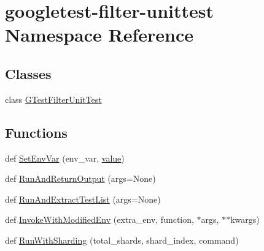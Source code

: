 \hypertarget{namespacegoogletest-filter-unittest}{}\section{googletest-\/filter-\/unittest Namespace Reference}
\label{namespacegoogletest-filter-unittest}
\subsection*{Classes}
\begin{DoxyCompactItemize}
\item 
class \mbox{\hyperlink{classgoogletest-filter-unittest_1_1_g_test_filter_unit_test}{G\+Test\+Filter\+Unit\+Test}}
\end{DoxyCompactItemize}
\subsection*{Functions}
\begin{DoxyCompactItemize}
\item 
def \mbox{\hyperlink{namespacegoogletest-filter-unittest_a829bf5a2df452c96f0ad7a1f0d47401e}{Set\+Env\+Var}} (env\+\_\+var, \mbox{\hyperlink{_obj__test_2lib_2googletest-master_2googlemock_2test_2gmock-matchers__test_8cc_a337b8a670efc0b086ad3af163f3121b6}{value}})
\item 
def \mbox{\hyperlink{namespacegoogletest-filter-unittest_a24bae2131f3ea9a470f76a090f704d23}{Run\+And\+Return\+Output}} (args=None)
\item 
def \mbox{\hyperlink{namespacegoogletest-filter-unittest_a400558042f3187a396a3dfe020423dfb}{Run\+And\+Extract\+Test\+List}} (args=None)
\item 
def \mbox{\hyperlink{namespacegoogletest-filter-unittest_aaad57c395db92d5b0cdd94a3af2359bf}{Invoke\+With\+Modified\+Env}} (extra\+\_\+env, function, $\ast$args, $\ast$$\ast$kwargs)
\item 
def \mbox{\hyperlink{namespacegoogletest-filter-unittest_a838960aa0f3d4cce4b0f76169929b94e}{Run\+With\+Sharding}} (total\+\_\+shards, shard\+\_\+index, command)
\end{DoxyCompactItemize}
